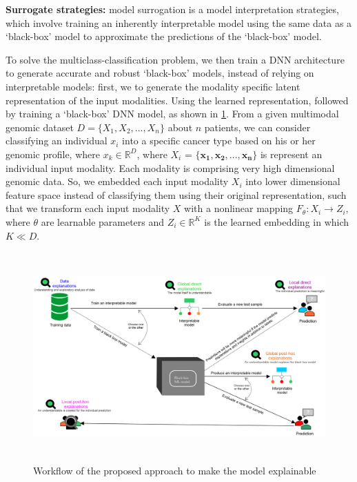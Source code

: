 \begin{definition}
    \textbf{Surrogate strategies:} model surrogation is a model interpretation strategies, which involve training an inherently interpretable model using the same data as a `black-box' model to approximate the predictions of the `black-box' model. 
\end{definition}

\hspace*{3.5mm} To solve the multiclass-classification problem, we then train a DNN architecture to generate accurate and robust `black-box' models, instead of relying on interpretable models: first, we to generate the modality specific latent representation of the input modalities. Using the learned representation, followed by training a `black-box' DNN model, as shown in \cref{fig:chapter_2_wf}. From a given multimodal genomic dataset $D=\{X_1, X_2,..., X_n\}$ about $n$ patients, we can consider classifying an individual $x_i$ into a specific cancer type based on his or her genomic profile, where $x_k \in \mathbb{R}^{D}$, where $X_i$ = ${\mathbf{\{x_1,x_2,..., x_n}}\}$ is represent an individual input modality. Each modality is comprising very high dimensional genomic data. So, we embedded each input modality $X_i$ into lower dimensional feature space instead of classifying them using their original representation, such that we transform each input modality $X$ with a nonlinear mapping $F_{\theta}: X_i \rightarrow Z_i$, where $\theta$ are learnable parameters and $Z_i \in \mathbb{R}^{K}$ is the learned embedding in which $K \ll D$. 

\begin{figure}[h]
	\centering
		\includegraphics[width=0.9\linewidth,height=80mm]{images/g_t_l_xai.png}
		\caption{Workflow of the proposed approach to make the model explainable}
        \label{fig:chapter_2_wf}
\end{figure}

